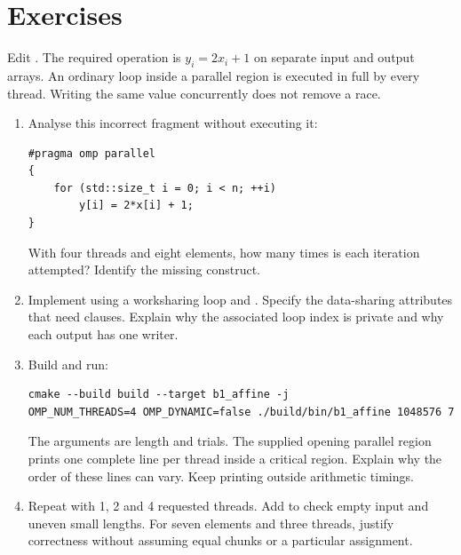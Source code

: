 \section{Exercises}
Edit . The required operation is $y_i=2x_i+1$ on separate
input and output arrays. An ordinary loop inside a parallel region is executed
in full by every thread. Writing the same value concurrently does not remove a race.
\begin{enumerate}
\item Analyse this incorrect fragment without executing it:
\begin{lstlisting}
#pragma omp parallel
{
    for (std::size_t i = 0; i < n; ++i)
        y[i] = 2*x[i] + 1;
}
\end{lstlisting}
With four threads and eight elements, how many times is each iteration attempted?
Identify the missing construct.
\item Implement  using a worksharing loop and
. Specify the data-sharing attributes that need clauses.
Explain why the associated loop index is private and why each output has one writer.
\item Build and run:
\begin{lstlisting}[style=shell]
cmake --build build --target b1_affine -j
OMP_NUM_THREADS=4 OMP_DYNAMIC=false ./build/bin/b1_affine 1048576 7
\end{lstlisting}
The arguments are length and trials. The supplied opening parallel region prints
one complete line per thread inside a critical region. Explain why the order of
these lines can vary. Keep printing outside arithmetic timings.
\item Repeat with 1, 2 and 4 requested threads. Add  to check empty input and
uneven small lengths. For seven elements and three threads, justify correctness
without assuming equal chunks or a particular assignment.
\end{enumerate}

